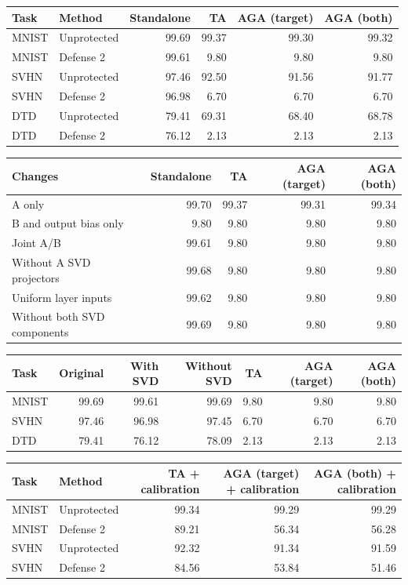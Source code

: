 \begin{tabular}{llrrrr}
\toprule
Task & Method & Standalone & TA & AGA (target) & AGA (both) \\
\midrule
MNIST & Unprotected & 99.69 & 99.37 & 99.30 & 99.32 \\
MNIST & Defense 2 & 99.61 & 9.80 & 9.80 & 9.80 \\
SVHN & Unprotected & 97.46 & 92.50 & 91.56 & 91.77 \\
SVHN & Defense 2 & 96.98 & 6.70 & 6.70 & 6.70 \\
DTD & Unprotected & 79.41 & 69.31 & 68.40 & 68.78 \\
DTD & Defense 2 & 76.12 & 2.13 & 2.13 & 2.13 \\
\bottomrule
\end{tabular}

\begin{tabular}{lrrrr}
\toprule
Changes & Standalone & TA & AGA (target) & AGA (both) \\
\midrule
A only & 99.70 & 99.37 & 99.31 & 99.34 \\
B and output bias only & 9.80 & 9.80 & 9.80 & 9.80 \\
Joint A/B & 99.61 & 9.80 & 9.80 & 9.80 \\
Without A SVD projectors & 99.68 & 9.80 & 9.80 & 9.80 \\
Uniform layer inputs & 99.62 & 9.80 & 9.80 & 9.80 \\
Without both SVD components & 99.69 & 9.80 & 9.80 & 9.80 \\
\bottomrule
\end{tabular}

\begin{tabular}{lrrrrrr}
\toprule
Task & Original & With SVD & Without SVD & TA & AGA (target) & AGA (both) \\
\midrule
MNIST & 99.69 & 99.61 & 99.69 & 9.80 & 9.80 & 9.80 \\
SVHN & 97.46 & 96.98 & 97.45 & 6.70 & 6.70 & 6.70 \\
DTD & 79.41 & 76.12 & 78.09 & 2.13 & 2.13 & 2.13 \\
\bottomrule
\end{tabular}

\begin{tabular}{llrrr}
\toprule
Task & Method & TA + calibration & AGA (target) + calibration & AGA (both) + calibration \\
\midrule
MNIST & Unprotected & 99.34 & 99.29 & 99.29 \\
MNIST & Defense 2 & 89.21 & 56.34 & 56.28 \\
SVHN & Unprotected & 92.32 & 91.34 & 91.59 \\
SVHN & Defense 2 & 84.56 & 53.84 & 51.46 \\
\bottomrule
\end{tabular}

